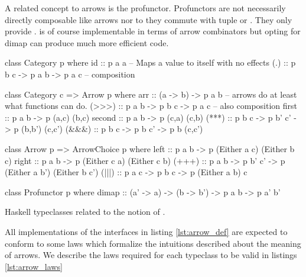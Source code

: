 A related concept to arrows is the profunctor. Profunctors are not
necessarily directly composable like arrows nor to they commute with
tuple or . They only provide . 
is of course implementable in terms of arrow combinators but opting
for dimap can produce much more efficient code.


\begin{code}
\begin{haskellcode}
class Category p where
  id :: p a a -- Maps a value to itself with no effects
  (.) :: p b c -> p a b -> p a c -- composition

class Category c => Arrow p where
  arr :: (a -> b) -> p a b -- arrows do at least what functions can do.
  (>>>) :: p a b -> p b c -> p a c -- also composition
  first :: p a b -> p (a,c) (b,c)
  second :: p a b -> p (c,a) (c,b)
  (***) :: p b c -> p b' c' -> p (b,b') (c,c')
  (&&&) :: p b c -> p b c' -> p b (c,c')

class Arrow p => ArrowChoice p where
  left :: p a b -> p (Either a c) (Either b c)
  right :: p a b -> p (Either c a) (Either c b)
  (+++) :: p a b -> p b' c' -> p (Either a b') (Either b c')
  (|||) :: p a c -> p b c -> p (Either a b) c

class Profunctor p where
  dimap :: (a' -> a) -> (b -> b') -> p a b -> p a' b'
\end{haskellcode}
  \caption{\label{lst:arrow_def}Haskell typeclasses related to the
    notion of .}
\end{code}


All implementations of the interfaces in listing \ref{lst:arrow_def}
are expected to conform to some laws which formalize the intuitions
described about the meaning of arrows. We describe the laws required
for each typeclass to be valid in listings \ref{lst:arrow_laws}

